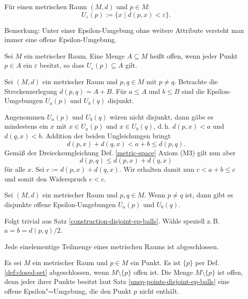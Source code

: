 \begin{Definition}\newlinefirst
Für einen metrischen Raum $(M,d)$ und $p\in M$:
\[U_\varepsilon(p) := \{x\mid d(p,x)<\varepsilon\}.\]
\end{Definition}
Bemerkung: Unter einer Epsilon-Umgebung ohne weitere Attribute
versteht man immer eine offene Epsilon-Umgebung.

\begin{Definition}\newlinefirst
Sei $M$ ein metrischer Raum. Eine Menge $A\subseteq M$ heißt
offen, wenn jeder Punkt $p\in A$ ein $\varepsilon$ besitzt, so dass
$U_\varepsilon(p)\subseteq A$ gilt.
\end{Definition}

\begin{Satz}%
\label{construction-disjoint-ep-balls}
Sei $(M,d)$ ein metrischer Raum und $p,q\in M$ mit $p\ne q$.
Betrachte die Streckenzerlegung $d(p,q)=A+B$. Für $a\le A$ und
$b\le B$ sind die Epsilon-Umgebungen $U_a(p)$ und $U_b(q)$ disjunkt.
\end{Satz}

\begin{Beweis}
Angenommen $U_a(p)$ und $U_b(q)$ wären nicht disjunkt, dann gäbe
es mindestens ein $x$ mit $x\in U_a(p)$ und $x\in U_b(q)$, d.\,h.
$d(p,x)<a$ und $d(q,x)<b$. Addition der beiden Ungleichungen
bringt
\[d(p,x)+d(q,x)<a+b\le d(p,q).\]
Gemäß der Dreiecksungleichung Def. \ref{metric-space} Axiom (M3) gilt
nun aber
\[d(p,q)\le d(p,x)+d(q,x)\]
für alle $x$. Sei $c:=d(p,x)+d(q,x)$. Wir erhalten damit nun
$c<a+b\le c$ und somit den Widerspruch $c<c$.\,\qedsymbol
\end{Beweis}

\begin{Satz}\label{uneq-points-disjoint-ep-balls}
Sei $(M,d)$ ein metrischer Raum und $p,q\in M$.
Wenn $p\ne q$ ist, dann gibt es disjunkte offene
Epsilon-Umgebungen $U_a(p)$ und $U_b(q)$.
\end{Satz}

\begin{Beweis}
Folgt trivial aus Satz \ref{construction-disjoint-ep-balls}.
Wähle speziell z.\,B. $a=b=d(p,q)/2$.\,\qedsymbol
\end{Beweis}

\begin{Satz}\label{singleton-closed}
Jede einelementige Teilmenge eines metrischen Raums ist abgeschlossen.
\end{Satz}
\begin{Beweis}
Es sei $M$ ein metrischer Raum und $p\in M$ ein Punkt. Es ist $\{p\}$
per Def. \ref{def:closed-set} abgeschlossen, wenn $M\setminus\{p\}$ offen
ist. Die Menge $M\setminus\{p\}$ ist offen, denn jeder ihrer Punkte
besitzt laut Satz \ref{uneq-points-disjoint-ep-balls} eine offene
Epsilon"=Umgebung, die den Punkt $p$ nicht enthält.\,\qedsymbol
\end{Beweis}

